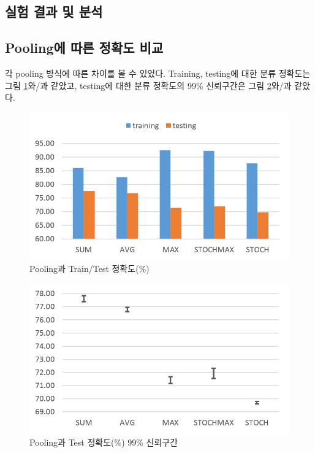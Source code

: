 \documentclass[a4paper,9pt,hidelinks]{article}
\begin{document}
\begin{multicols*}{2}
\section{실험 결과 및 분석}

\subsection{Pooling에 따른 정확도 비교}

각 pooling 방식에 따른 차이를 볼 수 있었다.
Training, testing에 대한 분류 정확도는 그림 \ref{fig:accuracy}와/과 같았고, testing에 대한 분류 정확도의 99\% 신뢰구간은 그림 \ref{fig:error_bar}와/과 같았다.

\begin{figure}[H]
\includegraphics[width=\linewidth]{accuracy}
\caption{Pooling과 Train/Test 정확도(\%)}
\label{fig:accuracy}
\end{figure}

\begin{figure}[H]
\includegraphics[width=\linewidth]{error_bar}
\caption{Pooling과 Test 정확도(\%) 99\% 신뢰구간}
\label{fig:error_bar}
\end{figure}


\end{multicols*}
\end{document}

